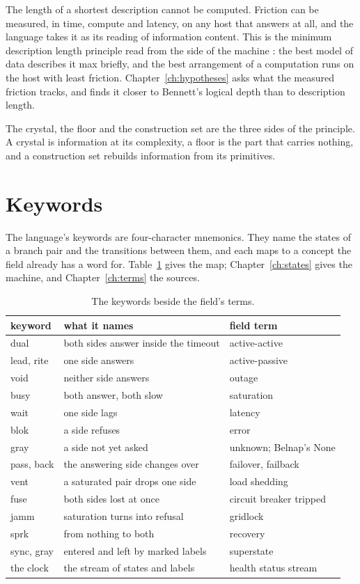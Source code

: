 The length of a shortest description cannot be computed. Friction can be measured, in time,
compute and latency, on any host that answers at all, and the language takes it as its reading of
information content. This is the minimum description length principle read from the side of the
machine \cite{src:Rissanen}: the best model of data describes it max briefly, and the best
arrangement of a computation runs on the host with least friction.
Chapter~\ref{ch:hypotheses} asks what the measured friction tracks, and finds it closer to
Bennett's logical depth \cite{src:Bennett} than to description length.

The crystal, the floor and the construction set are the three sides of the principle. A crystal
is information at its complexity, a floor is the part that carries nothing, and a construction set
rebuilds information from its primitives.

\section{Keywords}

The language's keywords are four-character mnemonics. They name the states of a branch pair and the
transitions between them, and each maps to a concept the field already has a word for.
Table~\ref{tab:mnemonics} gives the map; Chapter~\ref{ch:states} gives the machine, and
Chapter~\ref{ch:terms} the sources.

\begin{table}[h]
\centering
\small
\begin{tabular}{@{}l l l@{}}
\toprule
keyword & what it names & field term \\
\midrule
dual & both sides answer inside the timeout & active-active \\
lead, rite & one side answers & active-passive \\
void & neither side answers & outage \\
busy & both answer, both slow & saturation \\
wait & one side lags & latency \\
blok & a side refuses & error \\
gray & a side not yet asked & unknown; Belnap's None \\
pass, back & the answering side changes over & failover, failback \\
vent & a saturated pair drops one side & load shedding \\
fuse & both sides lost at once & circuit breaker tripped \\
jamm & saturation turns into refusal & gridlock \\
sprk & from nothing to both & recovery \\
sync, gray & entered and left by marked labels & superstate \\
the clock & the stream of states and labels & health status stream \\
\bottomrule
\end{tabular}
\caption{The keywords beside the field's terms.}
\label{tab:mnemonics}
\end{table}
